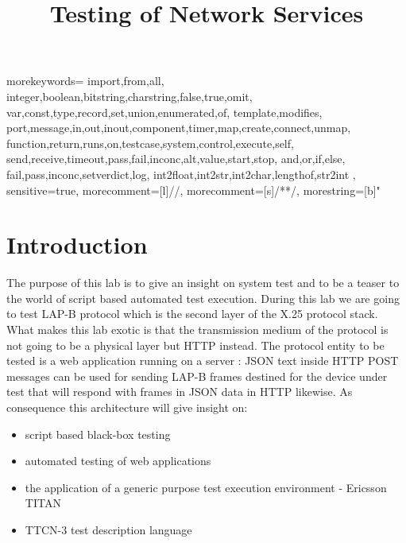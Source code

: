 \documentclass[a4paper]{article}
\title{Testing of Network Services}
\author{}
\date{}
\begin{document}
{
    morekeywords={
            import,from,all,
            integer,boolean,bitstring,charstring,false,true,omit,
            var,const,type,record,set,union,enumerated,of,
            template,modifies,
            port,message,in,out,inout,component,timer,map,create,connect,unmap,
            function,return,runs,on,testcase,system,control,execute,self,
            send,receive,timeout,pass,fail,inconc,alt,value,start,stop,
            and,or,if,else,
            fail,pass,inconc,setverdict,log,
            int2float,int2str,int2char,lengthof,str2int
        },
    sensitive=true, %
    morecomment=[l]{//}, %
    morecomment=[s]{/*}{*/}, %
    morestring=[b]" %
}
\lstset{language=TTCN3}
\lstset{frame=single}
\lstset{breaklines=true}

\maketitle

\tableofcontents

\section{Introduction}

The purpose of this lab is to give an insight on system test and to be a teaser to the world of script based automated
test execution. During this lab we are going to test LAP-B protocol which is the second layer of the X.25 protocol
stack. What makes this lab exotic is that the transmission medium of the protocol is not going to be a physical layer
but HTTP instead. The protocol entity to be tested is a web application running on a server : JSON text inside HTTP
POST messages can be used for sending LAP-B frames destined for the device under test that will respond with frames in
JSON data in HTTP likewise. As consequence this architecture will give insight on:
\begin{itemize}
    \item script based black-box testing
    \item automated testing of web applications
    \item the application of a generic purpose test execution environment - Ericsson TITAN
    \item TTCN-3 test description language
\end{itemize}
\end{document}
